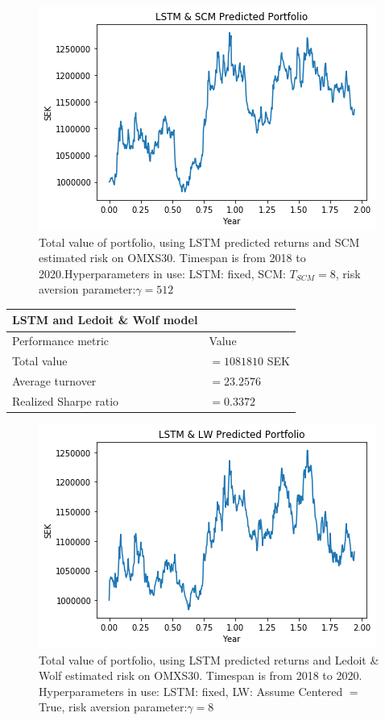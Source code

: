 \documentclass[final]{LTHtwocol} %
\begin{document}
\begin{figure}[H]
	\centering
	\includegraphics[width=0.8\columnwidth]{Pics/result/LSTM_SCM.png}
	\caption{Total value of portfolio, using LSTM predicted returns and SCM estimated risk on OMXS30. Timespan is from 2018 to 2020.Hyperparameters in use: LSTM: fixed, SCM: $T_{SCM} = 8$, risk aversion parameter:$\gamma= 512$}
	\label{fig:LSTMSCM} 
\end{figure}

\begin{center}
 \begin{tabular}{||l l||} 
 \hline
 \textbf{LSTM and Ledoit \& Wolf model} & \\ [0.5ex] 
 \hline
 Performance metric & Value\\ [0.5ex] 
 \hline\hline
 Total value & $=1081810$ SEK \\ 
 \hline
 Average turnover& $=23.2576$ \\
 \hline
 Realized Sharpe ratio & $=0.3372$ \\  [1ex] 
 \hline
\end{tabular}
\label{tab:LSTM and LW data}
\end{center}

\begin{figure}[h]
	\centering
	\includegraphics[width=0.8\columnwidth]{Pics/result/LSTM_LW.png}
	\caption{Total value of portfolio, using LSTM predicted returns and Ledoit \& Wolf estimated risk on OMXS30. Timespan is from 2018 to 2020. Hyperparameters in use: LSTM: fixed, LW: Assume Centered $=$ True, risk aversion parameter:$\gamma= 8$}
	\label{fig:LSTMLW} 
\end{figure}
\end{document}
